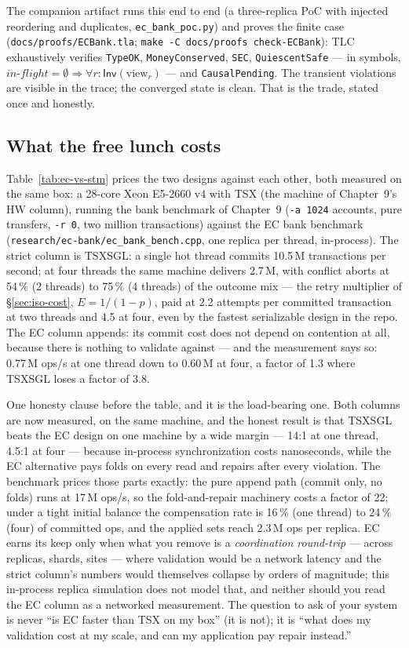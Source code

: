 The companion artifact  runs this end to end (a
three-replica PoC with injected reordering and duplicates,
\texttt{ec\_bank\_poc.py}) and proves the finite case
(\texttt{docs/proofs/ECBank.tla}; \texttt{make -C docs/proofs
check-ECBank}): TLC exhaustively verifies \texttt{TypeOK},
\texttt{MoneyConserved}, \texttt{SEC}, \texttt{QuiescentSafe} --- in
symbols, $\mathit{in\text{-}flight} = \emptyset \Rightarrow
\forall r: \mathsf{Inv}(\mathrm{view}_r)$ --- and \texttt{CausalPending}.
The transient violations are visible in the trace; the converged state is
clean. That is the trade, stated once and honestly.

\subsection*{What the free lunch costs}

Table~\ref{tab:ec-vs-stm} prices the two designs against each other, both
measured on the same box: a 28-core Xeon E5-2660 v4 with TSX (the machine
of Chapter~9's HW column), running the bank benchmark of
Chapter~9 (\texttt{-a 1024} accounts, pure transfers, \texttt{-r 0}, two
million transactions) against the EC bank benchmark
(\texttt{research/ec-bank/ec\_bank\_bench.cpp}, one replica per thread,
in-process). The strict column is TSXSGL: a single hot thread commits
10.5\,M transactions per second; at four threads the same machine delivers
2.7\,M, with conflict aborts at 54\,$\%$ (2 threads) to 75\,$\%$ (4
threads) of the outcome mix --- the retry multiplier of
\S\ref{sec:iso-cost}, $E = 1/(1-p)$, paid at 2.2 attempts per committed
transaction at two threads and 4.5 at four, even by the fastest
serializable design in the repo. The EC column appends: its commit cost
does not depend on contention at all, because there is nothing to validate
against --- and the measurement says so: 0.77\,M ops/s at one thread down
to 0.60\,M at four, a factor of 1.3 where TSXSGL loses a factor of 3.8.

One honesty clause before the table, and it is the load-bearing one. Both
columns are now measured, on the same machine, and the honest result is
that TSXSGL beats the EC design on one machine by a wide margin --- 14:1
at one thread, 4.5:1 at four --- because in-process synchronization costs
nanoseconds, while the EC alternative pays folds on every read and repairs
after every violation. The benchmark prices those parts exactly: the pure
append path (commit only, no folds) runs at 17\,M ops/s, so the
fold-and-repair machinery costs a factor of 22; under a tight initial
balance the compensation rate is 16\,$\%$ (one thread) to 24\,$\%$ (four)
of committed ops, and the applied sets reach 2.3\,M ops per replica. EC
earns its keep only when what you remove is a \emph{coordination
round-trip} --- across replicas, shards, sites --- where validation would
be a network latency and the strict column's numbers would themselves
collapse by orders of magnitude; this in-process replica simulation does
not model that, and neither should you read the EC column as a networked
measurement. The question to ask of your system is never ``is EC faster
than TSX on my box'' (it is not); it is ``what does my validation cost at
my scale, and can my application pay repair instead.''

